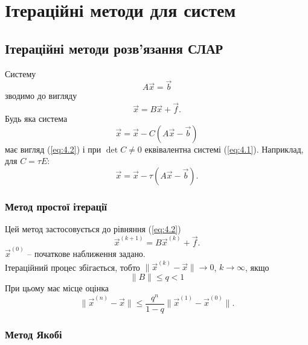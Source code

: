 \section{Ітераційні методи для систем}

\subsection{Ітераційні методи розв'язання СЛАР}

Систему
\begin{equation}
	\label{eq:4.1}
	A \vec x = \vec b
\end{equation}
зводимо до вигляду
\begin{equation}
	\label{eq:4.2}
	\vec x = B \vec x + \vec f.
\end{equation}
Будь яка система
\begin{equation}
	\label{eq:4.3}
	\vec x = \vec x - C (A \vec x - \vec b)
\end{equation}
має вигляд (\ref{eq:4.2}) і при $\det C \ne 0$ еквівалентна системі (\ref{eq:4.1}). Наприклад, для $C = \tau E$:
\begin{equation}
	\label{eq:4.4}
	\vec x = \vec x - \tau (A \vec x - \vec b).
\end{equation}


\subsubsection{Метод простої ітерації}

Цей метод застосовується до рівняння (\ref{eq:4.2})
\begin{equation}
	\label{eq:4.5}
	\vec x^{(k+1)} = B \vec x^{(k)} + \vec f.
\end{equation}
$\vec x^{(0)}$ -- початкове наближення задано.\\

Ітераційний процес збігається, тобто $\| \vec x^{(k)} - \vec x\| \to 0$, $k\to\infty$, якщо
\begin{equation}
	\label{eq:4.6}
	\|B\| \le q < 1
\end{equation}
При цьому має місце оцінка
\begin{equation}
	\label{eq:4.7}
	\| \vec x^{(n)} - \vec x\| \le \dfrac{q^n}{1-q}\|\vec x^{(1)} - \vec x^{(0)}\|.
\end{equation}

\subsubsection{Метод Якобі}


